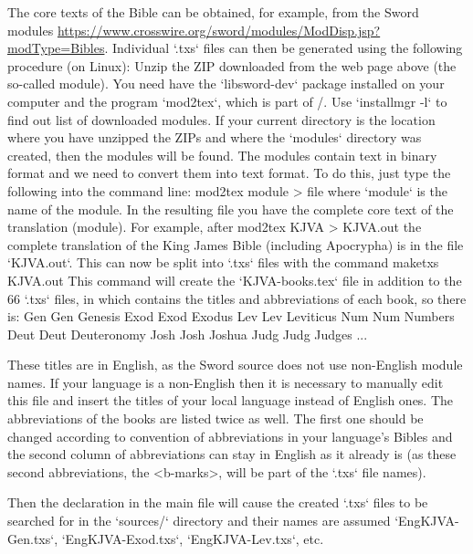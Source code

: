 {The core texts of the Bible can be obtained, for example, from the Sword modules 
\url{https://www.crosswire.org/sword/modules/ModDisp.jsp?modType=Bibles}.
Individual `.txs` files can then be generated using the following procedure (on Linux):
Unzip the ZIP downloaded from the  web page above (the so-called module). You need
have the `libsword-dev` package installed on your computer and the program
`mod2tex`, which is part of \OpBible/. Use `installmgr -l` to find out
list of downloaded modules. If your current directory is the location where you
have unzipped the ZIPs and where the `modules` directory was created, then the modules will be found. The modules contain text in binary format and we need 
to convert them into text format. To do this, just type the following into the command line: 
\begtt 
mod2tex module > file
\endtt 
where `module` is the name of the module. In the resulting file
you have the complete core text of the translation (module).
For example, after
\begtt
mod2tex KJVA > KJVA.out
\endtt
the complete translation of the King James Bible (including Apocrypha) is in the file `KJVA.out`.
This can now be split into `.txs` files with the command
\begtt
maketxs KJVA.out
\endtt
This command will create the `KJVA-books.tex` file in addition to the 66 `.txs` files, in which
contains the titles and abbreviations of each book, so there is:
\begtt
\BookTitle Gen Gen {Genesis}
\BookTitle Exod Exod {Exodus}
\BookTitle Lev Lev {Leviticus}
\BookTitle Num Num  {Numbers}
\BookTitle Deut Deut {Deuteronomy}
\BookTitle Josh Josh {Joshua}
\BookTitle Judg Judg {Judges}
...
\endtt

These titles are in English, as the Sword source does not use non-English module names. 
If your language is a non-English then it is necessary to manually edit this file and insert the titles of your local language instead of English ones.
The abbreviations of the books are listed twice as well. The first one should be changed according to convention of abbreviations in your language's Bibles and the second column of abbreviations can stay in English as it already is (as these second abbreviations, the <b-marks>, will be part of the `.txs` file names).  

Then the declaration 
\begtt
\def\txsfile {sources/Eng\tmark-\bmark.txs}
\endtt
in the main file will cause the created `.txs` files to be searched for 
in the `sources/` directory and their names are assumed
`EngKJVA-Gen.txs`, `EngKJVA-Exod.txs`, `EngKJVA-Lev.txs`, etc.

}
